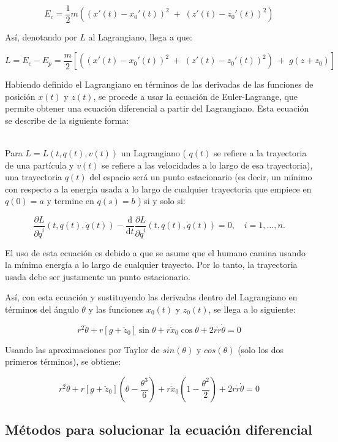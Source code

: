 \documentclass{article}
\begin{document}
$$E_c = \frac{1}{2}m((x'(t) - x_0'(t))^2  \; + \; (z'(t) - z_0'(t))^2)$$

Así, denotando por $L$ al Lagrangiano, llega a que:

$$
L = E_c - E_p = \frac{m}{2}[ ((x'(t) - x_0'(t))^2  \; + \; (z'(t) - z_0'(t))^2) \; + \; g(z+z_0)]
$$

Habiendo definido el Lagrangiano en términos de las derivadas de las funciones de posición $x(t)$ y $z(t)$, se procede a usar la ecuación de Euler-Lagrange, que permite obtener una ecuación diferencial a partir del Lagrangiano. Esta ecuación se describe de la siguiente forma:

\\

Para $L = L(t, q(t), v(t))$ un Lagrangiano ( $q(t)$ se refiere a la trayectoria de una partícula y $v(t)$ se refiere a las velocidades a lo largo de esa trayectoria), una trayectoria $q(t)$ del espacio será un punto estacionario (es decir, un mínimo con respecto a la energía usada a lo largo de cualquier trayectoria que empiece en $q(0) = a$ y termine en $q(s) = b$ ) si y solo si:

$$\frac{\partial L}{\partial \dot{q}^{i}} (t, q(t), \dot{q}(t)) - \frac{\text{d}}{\text{d}t} \frac{\partial L}{\partial \dot{q}^{i}} (t, q(t), \dot{q}(t)) = 0, \quad i = 1, \dots, n.$$

El uso de esta ecuación es debido a que se asume que el humano camina usando la mínima energía a lo largo de cualquier trayecto. Por lo tanto, la trayectoria usada debe ser justamente un punto estacionario.

Así, con esta ecuación y sustituyendo las derivadas dentro del Lagrangiano en términos del ángulo $\theta$ y las funciones $x_0(t)$ y $z_0(t)$, se llega a lo siguiente:

$$
r^2 \ddot{\theta} + r \left[ g + \ddot{z}_0 \right] \sin\theta + r \ddot{x}_0 \cos\theta + 2r\dot{r} \dot{\theta} = 0
$$

Usando las aproximaciones por Taylor de $sin(\theta)$ y $cos(\theta)$ (solo los dos primeros términos), se obtiene:

$$
r^2 \ddot{\theta} + r \left[ g + \ddot{z}_0 \right] (\theta  - \frac{\theta^3}{6})+ r \ddot{x}_0(1 -\frac{\theta^2}{2})  + 2r\dot{r} \dot{\theta} = 0
$$


\subsection{Métodos para solucionar la ecuación diferencial}
\end{document}
